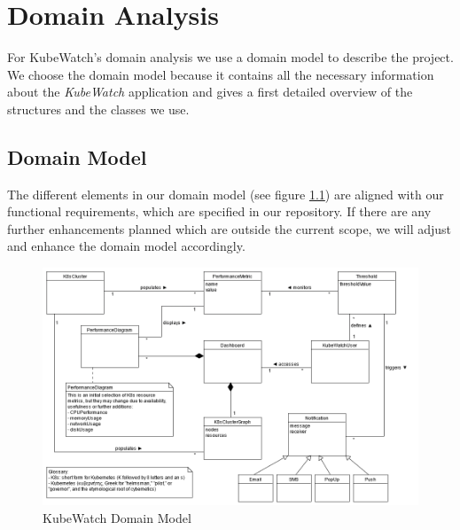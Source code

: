 \chapter{Domain Analysis}


For KubeWatch's domain analysis we use a domain model to describe the project. We choose the domain model because it contains all the necessary information about the \textit{KubeWatch} application and gives a first detailed overview of the structures and the classes we use.

\section{Domain Model}
The different elements in our domain model (see figure \ref{fig:domain-model}) are aligned with our functional requirements, which are specified in our repository. If there are any further enhancements planned which are outside the current scope, we will adjust and enhance the domain model accordingly.

\vspace{1cm}

\begin{figure}[h]
    \centering
    \caption{KubeWatch Domain Model}
    \label{fig:domain-model}
    \includegraphics[width=\textwidth]{resources/domain_model.png}
\end{figure}